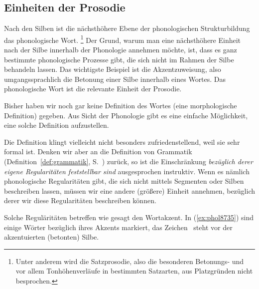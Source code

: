 \label{sec:prosodie}


\subsection{Einheiten der Prosodie}

Nach den Silben ist die nächsthöhere Ebene der phonologischen Strukturbildung das phonologische Wort.%
\footnote{Unter anderem wird die Satzprosodie, also die besonderen Betonungs- und vor allem Tonhöhenverläufe in bestimmten Satzarten, aus Platzgründen nicht besprochen.}
Der Grund, warum man eine nächsthöhere Einheit nach der Silbe innerhalb der Phonologie annehmen möchte, ist, dass es ganz bestimmte phonologische Prozesse gibt, die sich nicht im Rahmen der Silbe behandeln lassen.
Das wichtigste Beispiel ist die Akzentzuweisung, also umgangssprachlich die Betonung einer Silbe innerhalb eines Wortes.
Das phonologische Wort ist die relevante Einheit der Prosodie.

Bisher haben wir noch gar keine Definition des Wortes (\zB eine morphologische Definition) gegeben.
Aus Sicht der Phonologie gibt es eine einfache Möglichkeit, eine solche Definition aufzustellen. 


Die Definition klingt vielleicht nicht besonders zufriedenstellend, weil sie sehr formal ist.
Denken wir aber an die Definition von Grammatik (Definition~\ref{def:grammatik}, S.~\pageref{def:grammatik}) zurück, so ist die Einschränkung \textit{bezüglich derer eigene Regularitäten feststellbar sind} ausgesprochen instruktiv.
Wenn es nämlich phonologische Regularitäten gibt, die sich nicht mittels Segmenten oder Silben beschreiben lassen, müssen wir eine andere (größere) Einheit annehmen, bezüglich derer wir diese Regularitäten beschreiben können.

Solche Reguläritäten betreffen wie gesagt den Wortakzent.
In (\ref{ex:phol8735}) sind einige Wörter bezüglich ihres Akzents markiert, das Zeichen \Akz\ steht vor der akzentuierten (betonten) Silbe.

\begin{exe}
  \ex\label{ex:phol8735}
  \begin{xlist}
  \end{xlist}
\end{exe}

